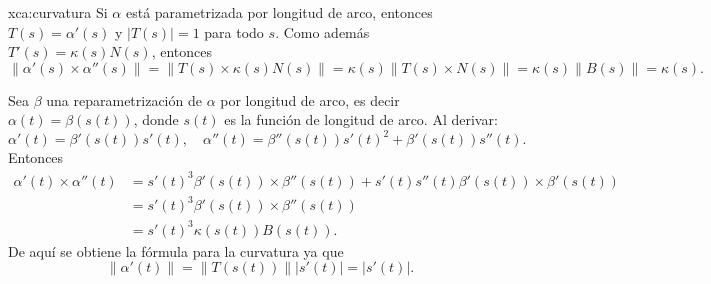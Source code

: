 \begin{sol}{xca:curvatura}
	Si $\alpha$ está parametrizada por longitud de arco, entonces $T(s)=\alpha'(s)$ y $|T(s)|=1$ para todo $s$. 
	Como además $T'(s)=\kappa(s)N(s)$, entonces
	\[
		\|\alpha'(s)\times\alpha''(s)\|=\|T(s)\times\kappa(s)N(s)\|=\kappa(s)\|T(s)\times N(s)\|=\kappa(s)\|B(s)\|=\kappa(s).
	\]

	Sea $\beta$ una reparametrización de $\alpha$ por longitud de
	arco, es decir $\alpha(t)=\beta(s(t))$, donde $s(t)$ es la función de
	longitud de arco. Al derivar:
	\begin{equation}
		\label{eq:derivadas}
		\alpha'(t)=\beta'(s(t))s'(t),\quad
		\alpha''(t)=\beta''(s(t))s'(t)^2+\beta'(s(t))s''(t).
	\end{equation}
	Entonces
	\begin{align*}
		\alpha'(t)\times\alpha''(t)
		&=s'(t)^3\beta'(s(t))\times\beta''(s(t))+s'(t)s''(t)\beta'(s(t))\times\beta'(s(t))\\
		&=s'(t)^3\beta'(s(t))\times\beta''(s(t))\\
		&=s'(t)^3\kappa(s(t))B(s(t)).
	\end{align*}
	De aquí se obtiene la fórmula para la curvatura ya que
	\[
	\|\alpha'(t)\|=\|T(s(t))\||s'(t)|=|s'(t)|.
	\]
\end{sol}

